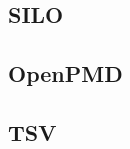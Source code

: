 \subsection{SILO}
\label{sec:silo}

\subsection{OpenPMD}
\label{sec:openpmd}

\subsection{TSV}
\label{sec:tsv}